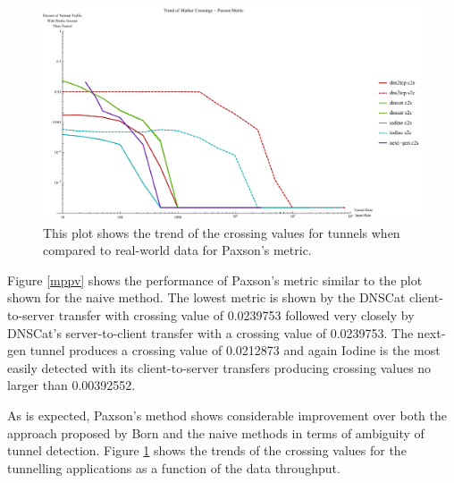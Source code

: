 \documentclass[12pt]{report}
\theoremstyle{remark}
\theoremstyle{definition}
\theoremstyle{definition}
\theoremstyle{definition}
\begin{document}
\begin{figure}
\centering
\includegraphics[width=\textwidth]{figures/cpplot.pdf}
\caption[Trend of Crossing Value for Tunnels - Paxson's Metric]{This plot shows
the trend of the crossing values for tunnels when compared to real-world data for
Paxson's metric.}
\label{cpplot}
\end{figure}

Figure \ref{mppv} shows the performance of Paxson's metric similar to the plot
shown for the naive method. The lowest metric is shown by the DNSCat
client-to-server transfer with crossing value of 0.0239753 followed very closely
by DNSCat's server-to-client transfer with a crossing value of 0.0239753. The
next-gen tunnel produces a crossing value of 0.0212873 and again Iodine is the
most easily detected with its client-to-server transfers producing crossing
values no larger than 0.00392552.

As is expected, Paxson's method shows considerable improvement over both the
approach proposed by Born and the naive methods in terms of ambiguity of tunnel
detection. Figure \ref{cpplot} shows the trends of the crossing values for the
tunnelling applications as a function of the data throughput.
\end{document}
